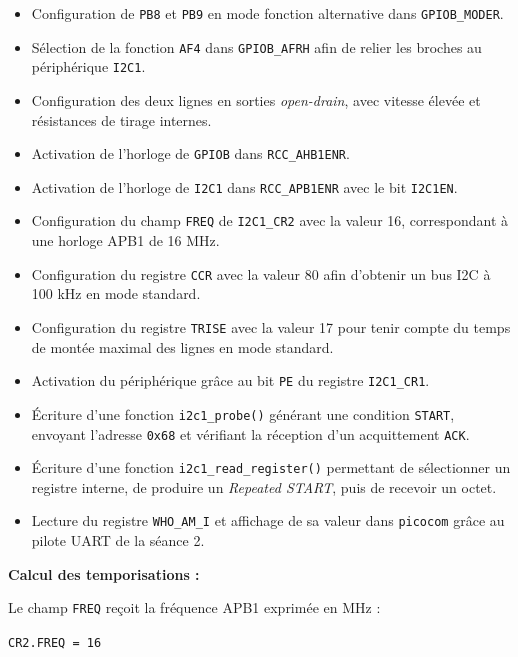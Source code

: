 \documentclass[11pt,a4paper]{article}
\begin{document}
\begin{sessionbox}
		\begin{itemize}
			\item Configuration de \texttt{PB8} et \texttt{PB9} en mode fonction alternative dans \texttt{GPIOB\_MODER}.
			\item Sélection de la fonction \texttt{AF4} dans \texttt{GPIOB\_AFRH} afin de relier les broches au périphérique \texttt{I2C1}.
			\item Configuration des deux lignes en sorties \textit{open-drain}, avec vitesse élevée et résistances de tirage internes.
			\item Activation de l'horloge de \texttt{GPIOB} dans \texttt{RCC\_AHB1ENR}.
			\item Activation de l'horloge de \texttt{I2C1} dans \texttt{RCC\_APB1ENR} avec le bit \texttt{I2C1EN}.
			\item Configuration du champ \texttt{FREQ} de \texttt{I2C1\_CR2} avec la valeur 16, correspondant à une horloge APB1 de 16 MHz.
			\item Configuration du registre \texttt{CCR} avec la valeur 80 afin d'obtenir un bus I2C à 100 kHz en mode standard.
			\item Configuration du registre \texttt{TRISE} avec la valeur 17 pour tenir compte du temps de montée maximal des lignes en mode standard.
			\item Activation du périphérique grâce au bit \texttt{PE} du registre \texttt{I2C1\_CR1}.
			\item Écriture d'une fonction \texttt{i2c1\_probe()} générant une condition \texttt{START}, envoyant l'adresse \texttt{0x68} et vérifiant la réception d'un acquittement \texttt{ACK}.
			\item Écriture d'une fonction \texttt{i2c1\_read\_register()} permettant de sélectionner un registre interne, de produire un \textit{Repeated START}, puis de recevoir un octet.
			\item Lecture du registre \texttt{WHO\_AM\_I} et affichage de sa valeur dans \texttt{picocom} grâce au pilote UART de la séance 2.
		\end{itemize}
		
		\vspace{0.3cm}
		
		\textbf{Calcul des temporisations :}
		
		Le champ \texttt{FREQ} reçoit la fréquence APB1 exprimée en MHz :
		
		\begin{center}
			\texttt{CR2.FREQ = 16}
		\end{center}
		

\end{sessionbox}
\end{document}
